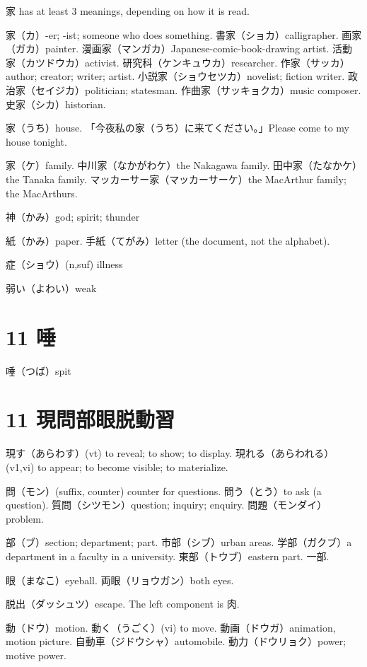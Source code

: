 家 has at least 3 meanings, depending on how it is read.

家（カ）-er; -ist; someone who does something.
書家（ショカ）calligrapher.
画家（ガカ）painter.
漫画家（マンガカ）Japanese-comic-book-drawing artist.
活動家（カツドウカ）activist.
研究科（ケンキュウカ）researcher.
作家（サッカ）author; creator; writer; artist.
小説家（ショウセツカ）novelist; fiction writer.
政治家（セイジカ）politician; statesman.
作曲家（サッキョクカ）music composer.
史家（シカ）historian.

家（うち）house.
「今夜私の家（うち）に来てください。」Please come to my house tonight.

家（ケ）family.
中川家（なかがわケ）the Nakagawa family.
田中家（たなかケ）the Tanaka family.
マッカーサー家（マッカーサーケ）the MacArthur family; the MacArthurs.

神（かみ）god; spirit; thunder

紙（かみ）paper.
手紙（てがみ）letter (the document, not the alphabet).

症（ショウ）(n,suf) illness

弱い（よわい）weak

\section{11 唾}

唾（つば）spit

\section{11 現問部眼脱動習}

現す（あらわす）(vt) to reveal; to show; to display.
現れる（あらわれる）(v1,vi) to appear; to become visible; to materialize.

問（モン）(suffix, counter) counter for questions.
問う（とう）to ask (a question).
質問（シツモン）question; inquiry; enquiry.
問題（モンダイ）problem.

部（ブ）section; department; part.
市部（シブ）urban areas.
学部（ガクブ）a department in a faculty in a university.
東部（トウブ）eastern part.
一部.

眼（まなこ）eyeball.
両眼（リョウガン）both eyes.

脱出（ダッシュツ）escape.
The left component is 肉.

動（ドウ）motion.
動く（うごく）(vi) to move.
動画（ドウガ）animation, motion picture.
自動車（ジドウシャ）automobile.
動力（ドウリョク）power; motive power.

